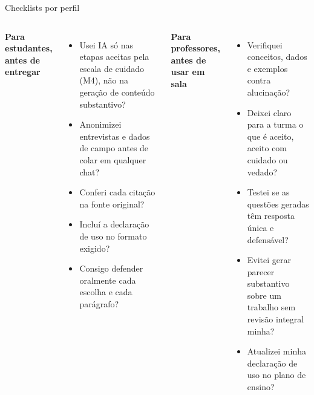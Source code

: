 \documentclass[11pt,aspectratio=169,t]{beamer}
\begin{document}
\begin{frame}{Checklists por perfil}
  \scriptsize
  \begin{columns}[t]
    \textbf{\color{verdeCodigo}Para estudantes, antes de entregar}
    \begin{itemize}
      \item[$\square$] Usei IA só nas etapas aceitas pela escala de cuidado (M4), não na geração de conteúdo substantivo?
      \item[$\square$] Anonimizei entrevistas e dados de campo antes de colar em qualquer chat?
      \item[$\square$] Conferi cada citação na fonte original?
      \item[$\square$] Incluí a declaração de uso no formato exigido?
      \item[$\square$] Consigo defender oralmente cada escolha e cada parágrafo?
    \end{itemize}
    \textbf{\color{laranjaDestaque}Para professores, antes de usar em sala}
    \begin{itemize}
      \item[$\square$] Verifiquei conceitos, dados e exemplos contra alucinação?
      \item[$\square$] Deixei claro para a turma o que é aceito, aceito com cuidado ou vedado?
      \item[$\square$] Testei se as questões geradas têm resposta única e defensável?
      \item[$\square$] Evitei gerar parecer substantivo sobre um trabalho sem revisão integral minha?
      \item[$\square$] Atualizei minha declaração de uso no plano de ensino?
    \end{itemize}
  \end{columns}
\end{frame}
\end{document}
